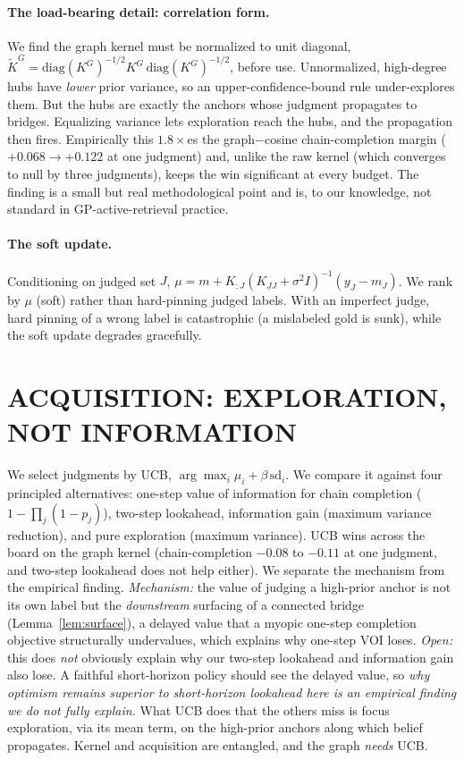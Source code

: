 \documentclass[twoside]{article}
\theoremstyle{plain}
\theoremstyle{definition}
\begin{document}
\paragraph{The load-bearing detail: correlation form.} We find the graph kernel must be normalized to unit
diagonal, $\widetilde K^G=\mathrm{diag}(K^G)^{-1/2}K^G\,\mathrm{diag}(K^G)^{-1/2}$, before use. Unnormalized,
high-degree hubs have \emph{lower} prior variance, so an upper-confidence-bound rule under-explores them. But the
hubs are exactly the anchors whose judgment propagates to bridges. Equalizing variance lets exploration reach the
hubs, and the propagation then fires. Empirically this $1.8\times$es the graph$-$cosine chain-completion margin
($+0.068\to+0.122$ at one judgment) and, unlike the raw kernel (which converges to null by three judgments), keeps
the win significant at every budget. The finding is a small but real methodological point and is, to our
knowledge, not standard in GP-active-retrieval practice.

\paragraph{The soft update.} Conditioning on judged set $J$, $\mu = m + K_{:J}(K_{JJ}+\sigma^2 I)^{-1}(y_J-m_J)$.
We rank by $\mu$ (soft) rather than hard-pinning judged labels. With an imperfect judge, hard pinning of a wrong
label is catastrophic (a mislabeled gold is sunk), while the soft update degrades gracefully.

\section{ACQUISITION: EXPLORATION, NOT INFORMATION}\label{sec:acq}
We select judgments by UCB, $\arg\max_i \mu_i+\beta\,\mathrm{sd}_i$. We compare it against four principled
alternatives: one-step value of information for chain completion ($1-\prod_j(1-p_j)$), two-step lookahead,
information gain (maximum variance reduction), and pure exploration (maximum variance). UCB wins across the board
on the graph kernel (chain-completion $-0.08$ to $-0.11$ at one judgment, and two-step lookahead does not help either). We separate the
mechanism from the empirical finding. \emph{Mechanism:} the value of judging a high-prior anchor is not its own
label but the \emph{downstream} surfacing of a connected bridge (Lemma~\ref{lem:surface}), a delayed value that a
myopic one-step completion objective structurally undervalues, which explains why one-step VOI loses. \emph{Open:}
this does \emph{not} obviously explain why our two-step lookahead and information gain also lose. A faithful
short-horizon policy should see the delayed value, so \emph{why optimism remains superior to short-horizon
lookahead here is an empirical finding we do not fully explain.} What UCB does that the others miss is focus
exploration, via its mean term, on the high-prior anchors along which belief propagates. Kernel and acquisition
are entangled, and the graph \emph{needs} UCB.
\end{document}
